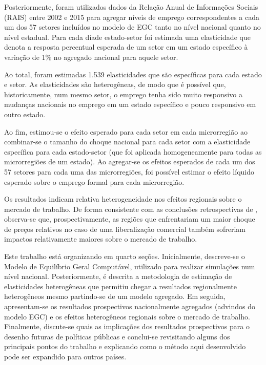 \documentclass{article}
\begin{document}
Posteriormente, foram utilizados dados da Relação Anual de Informações Sociais (RAIS) entre 2002 e 2015 para agregar níveis de emprego correspondentes a cada um dos 57 setores incluídos no modelo de EGC tanto no nível nacional quanto no nível estadual. Para cada díade estado-setor foi estimada uma elasticidade que denota a resposta percentual esperada de um setor em um estado específico à variação de 1\% no agregado nacional para aquele setor.

Ao total, foram estimadas 1.539 elasticidades que são específicas para cada estado e setor. As elasticidades são heterogêneas, de modo que é possível que, historicamente, num mesmo setor, o emprego tenha sido muito responsivo a mudanças nacionais no emprego em um estado específico e pouco responsivo em outro estado.

Ao fim, estimou-se o efeito esperado para cada setor em cada microrregião ao combinar-se o tamanho do choque nacional para cada setor com a elasticidade específica para cada estado-setor (que foi aplicada homogeneamente para todas as microrregiões de um estado). Ao agregar-se os efeitos esperados de cada um dos 57 setores para cada uma das microrregiões, foi possível estimar o efeito líquido esperado sobre o emprego formal para cada microrregião.

Os resultados indicam relativa heterogeneidade nos efeitos regionais sobre o mercado de trabalho. De forma consistente com as conclusões retrospectivas de \textcite{dixkovak}, observa-se que, prospectivamente, as regiões que enfrentariam um maior choque de preços relativos no caso de uma liberalização comercial também sofreriam impactos relativamente maiores sobre o mercado de trabalho. 

Este trabalho está organizando em quarto seções. Inicialmente, descreve-se o Modelo de Equilíbrio Geral Computável, utilizado para realizar simulações num nível nacional. Posteriormente, é descrita a metodologia de estimação de elasticidades heterogêneas que permitiu chegar a resultados regionalmente heterogêneos mesmo partindo-se de um modelo agregado. Em seguida, apresentam-se os resultados prospectivos nacionalmente agregados (advindos do modelo EGC) e os efeitos heterogêneos regionais sobre o mercado de trabalho. Finalmente, discute-se quais as implicações dos resultados prospectivos para o desenho futuras de políticas públicas e conclui-se revisitando alguns dos principais pontos do trabalho e explicando como o método aqui desenvolvido pode ser expandido para outros países.
\end{document}
